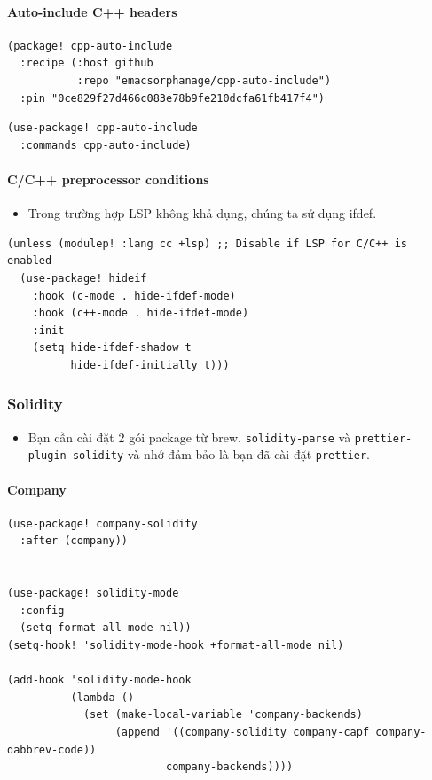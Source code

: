 \documentclass[11pt]{article}
\begin{document}
\paragraph{Auto-include C++ headers}
\label{sec:orgb18e453}

\begin{verbatim}
(package! cpp-auto-include
  :recipe (:host github
           :repo "emacsorphanage/cpp-auto-include")
  :pin "0ce829f27d466c083e78b9fe210dcfa61fb417f4")
\end{verbatim}

\begin{verbatim}
(use-package! cpp-auto-include
  :commands cpp-auto-include)
\end{verbatim}

\paragraph{C/C++ preprocessor conditions}
\label{sec:orgdb1e27c}
\begin{itemize}
\item Trong trường hợp LSP không khả dụng, chúng ta sử dụng ifdef.
\end{itemize}

\begin{verbatim}
(unless (modulep! :lang cc +lsp) ;; Disable if LSP for C/C++ is enabled
  (use-package! hideif
    :hook (c-mode . hide-ifdef-mode)
    :hook (c++-mode . hide-ifdef-mode)
    :init
    (setq hide-ifdef-shadow t
          hide-ifdef-initially t)))
\end{verbatim}

\subsubsection{Solidity}
\label{sec:org999a779}
\begin{itemize}
\item Bạn cần cài đặt 2 gói package từ brew. \texttt{solidity-parse} và
\texttt{prettier-plugin-solidity} và nhớ đảm bảo là bạn đã cài đặt \texttt{prettier}.
\end{itemize}
\paragraph{Company}
\label{sec:orgdd76353}
\begin{verbatim}
(use-package! company-solidity
  :after (company))


(use-package! solidity-mode
  :config
  (setq format-all-mode nil))
(setq-hook! 'solidity-mode-hook +format-all-mode nil)

(add-hook 'solidity-mode-hook
          (lambda ()
            (set (make-local-variable 'company-backends)
                 (append '((company-solidity company-capf company-dabbrev-code))
                         company-backends))))

\end{verbatim}
\end{document}
